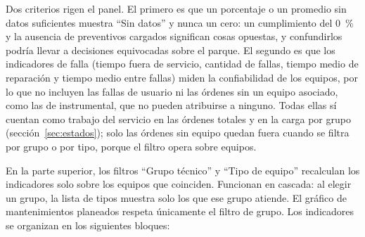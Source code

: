 \documentclass[10pt]{article}
\begin{document}
Dos criterios rigen el panel. El primero es que un porcentaje o un promedio sin datos suficientes muestra “Sin datos” y nunca un cero: un cumplimiento del 0~\% y la ausencia de preventivos cargados significan cosas opuestas, y confundirlos podría llevar a decisiones equivocadas sobre el parque. El segundo es que los indicadores de falla (tiempo fuera de servicio, cantidad de fallas, tiempo medio de reparación y tiempo medio entre fallas) miden la confiabilidad de los equipos, por lo que no incluyen las fallas de usuario ni las órdenes sin un equipo asociado, como las de instrumental, que no pueden atribuirse a ninguno. Todas ellas sí cuentan como trabajo del servicio en las órdenes totales y en la carga por grupo (sección~\ref{sec:estados}); solo las órdenes sin equipo quedan fuera cuando se filtra por grupo o por tipo, porque el filtro opera sobre equipos. 

En la parte superior, los filtros “Grupo técnico” y “Tipo de equipo” recalculan los indicadores solo sobre los equipos que coinciden. Funcionan en cascada: al elegir un grupo, la lista de tipos muestra solo los que ese grupo atiende. El gráfico de mantenimientos planeados respeta únicamente el filtro de grupo. Los indicadores se organizan en los siguientes bloques:
\end{document}

